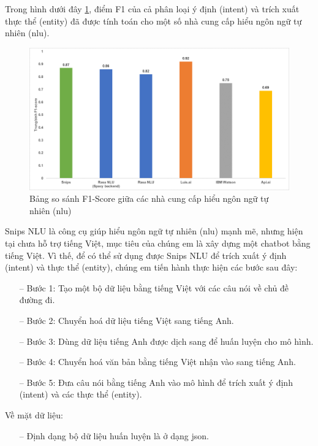 Trong hình dưới đây \ref{fig:benchmarks}, điểm F1 của cả phân loại ý định (intent) và trích xuất thực thể (entity) đã được tính toán cho một số nhà cung cấp hiểu ngôn ngữ tự nhiên (\ac{nlu}).

\begin{figure}[H]
    \centering
    \includegraphics[width=15cm]{images/comparisonimg/averageF1-scores.png}
    \caption{Bảng so sánh F1-Score giữa các nhà cung cấp hiểu ngôn ngữ tự nhiên (\ac{nlu})}
    \label{fig:benchmarks}
\end{figure}

Snips NLU là công cụ giúp hiểu ngôn ngữ tự nhiên (\ac{nlu}) mạnh mẽ, nhưng hiện tại chưa hỗ trợ tiếng Việt, mục tiêu của chúng em là xây dựng một chatbot bằng tiếng Việt. Vì thế, để có thể sử dụng được Snips NLU để trích xuất ý định (intent) và thực thể (entity), chúng em tiến hành thực hiện các bước sau đây:
\begin{itemize}
    \item[--] Bước 1: Tạo một bộ dữ liệu bằng tiếng Việt với các câu nói về chủ đề đường đi.
    \item[--] Bước 2: Chuyển hoá dữ liệu tiếng Việt sang tiếng Anh.
    \item[--] Bước 3: Dùng dữ liệu tiếng Anh được dịch sang để huấn luyện cho mô hình.
    \item[--] Bước 4: Chuyển hoá văn bản bằng tiếng Việt nhận vào sang tiếng Anh.
    \item[--] Bước 5: Đưa câu nói bằng tiếng Anh vào mô hình để trích xuất ý định (intent) và các thực thể (entity).
\end{itemize}

Về mặt dữ liệu:
\begin{itemize}
    \item[--] Định dạng bộ dữ liệu huấn luyện là ở dạng json.
\end{itemize}

